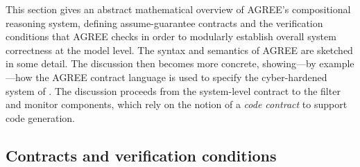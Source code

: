 This section gives an abstract mathematical overview of AGREE's
compositional reasoning system, defining assume-guarantee contracts
and the verification conditions that AGREE checks in order to
modularly establish overall system correctness at the model level.
The syntax and semantics of AGREE are sketched in some detail.  The
discussion then becomes more concrete, showing---by example---how the
AGREE contract language is used to specify the cyber-hardened system
of . The discussion proceeds from the
system-level contract to the filter and monitor components, which rely
on the notion of a \emph{code contract} to support code generation.


\subsection{Contracts and verification conditions}

